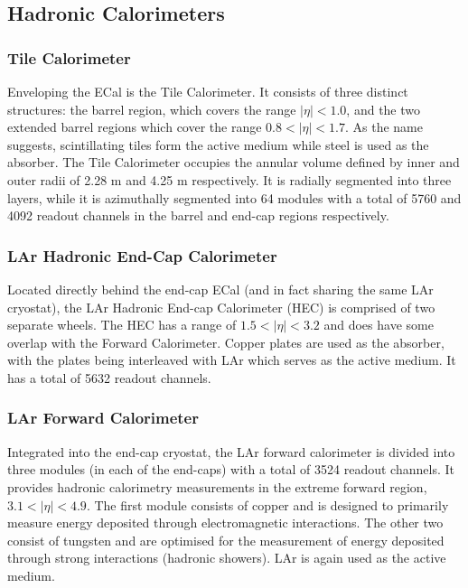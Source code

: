 \subsection{Hadronic Calorimeters}
\subsubsection{Tile Calorimeter}
Enveloping the ECal is the Tile Calorimeter. It consists of three distinct structures: the barrel region, which covers the range $ | \eta | < 1.0$, and the two extended barrel regions which cover the range $ 0.8 < | \eta | < 1.7 $. As the name suggests, scintillating tiles form the active medium while steel is used as the absorber. The Tile Calorimeter occupies the annular volume defined by inner and outer radii of 2.28 m and 4.25 m respectively. It is radially segmented into three layers, while it is azimuthally segmented into 64 modules with a total of 5760 and 4092 readout channels in the barrel and end-cap regions respectively.
\subsubsection{LAr Hadronic End-Cap Calorimeter}
Located directly behind the end-cap ECal (and in fact sharing the same LAr cryostat), the LAr Hadronic End-cap Calorimeter (HEC) is comprised of two separate wheels. The HEC has a range of $ 1.5 < | \eta | < 3.2$ and does have some overlap with the Forward Calorimeter. Copper plates are used as the absorber, with the plates being interleaved with LAr which serves as the active medium. It has a total of 5632 readout channels.
\subsubsection{LAr Forward Calorimeter}
Integrated into the end-cap cryostat, the LAr forward calorimeter is divided into three modules (in each of the end-caps) with a total of 3524 readout channels. It provides hadronic calorimetry measurements in the extreme forward region, $3.1<|\eta|<4.9$. The first module consists of copper and is designed to primarily measure energy deposited through electromagnetic interactions. The other two consist of tungsten and are optimised for the measurement of energy deposited through strong interactions (hadronic showers). LAr is again used as the active medium.
